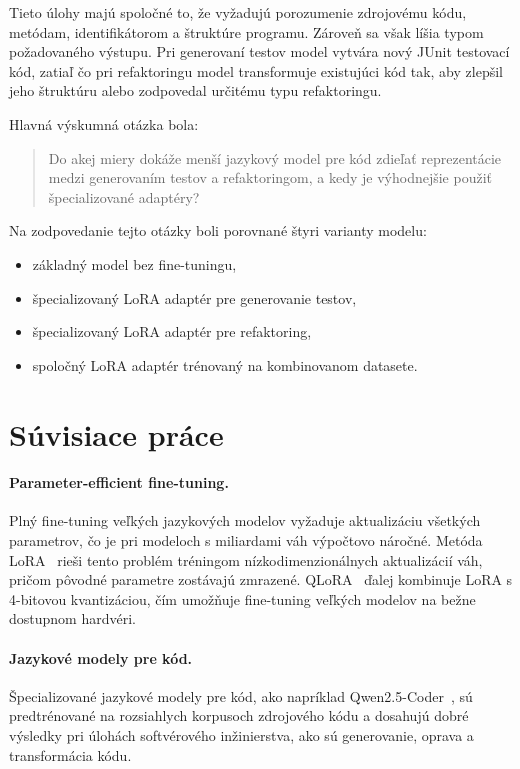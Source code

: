 \documentclass[11pt,a4paper]{article}
\begin{document}
Tieto úlohy majú spoločné to, že vyžadujú porozumenie zdrojovému kódu, metódam, identifikátorom a štruktúre programu. Zároveň sa však líšia typom požadovaného výstupu. Pri generovaní testov model vytvára nový JUnit testovací kód, zatiaľ čo pri refaktoringu model transformuje existujúci kód tak, aby zlepšil jeho štruktúru alebo zodpovedal určitému typu refaktoringu.

Hlavná výskumná otázka bola:

\begin{quote}
Do akej miery dokáže menší jazykový model pre kód zdieľať reprezentácie medzi generovaním testov a refaktoringom, a kedy je výhodnejšie použiť špecializované adaptéry?
\end{quote}

Na zodpovedanie tejto otázky boli porovnané štyri varianty modelu:
\begin{itemize}
\item základný model bez fine-tuningu,
\item špecializovaný LoRA adaptér pre generovanie testov,
\item špecializovaný LoRA adaptér pre refaktoring,
\item spoločný LoRA adaptér trénovaný na kombinovanom datasete.
\end{itemize}

\section{Súvisiace práce}
\label{sec:related}

\paragraph{Parameter-efficient fine-tuning.}
Plný fine-tuning veľkých jazykových modelov vyžaduje aktualizáciu všetkých parametrov, čo je pri modeloch s miliardami váh výpočtovo náročné. Metóda LoRA~\cite{lora} rieši tento problém tréningom nízkodimenzionálnych aktualizácií váh, pričom pôvodné parametre zostávajú zmrazené. QLoRA~\cite{qlora} ďalej kombinuje LoRA s 4-bitovou kvantizáciou, čím umožňuje fine-tuning veľkých modelov na bežne dostupnom hardvéri.

\paragraph{Jazykové modely pre kód.}
Špecializované jazykové modely pre kód, ako napríklad Qwen2.5-Coder~\cite{qwen25coder}, sú predtrénované na rozsiahlych korpusoch zdrojového kódu a dosahujú dobré výsledky pri úlohách softvérového inžinierstva, ako sú generovanie, oprava a transformácia kódu.
\end{document}
